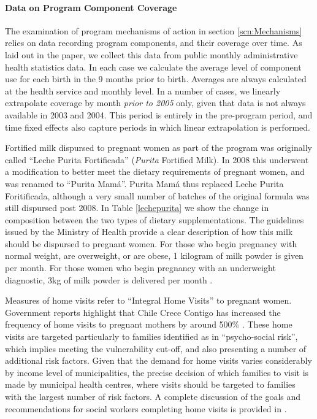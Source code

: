 \documentclass[12pt]{article}
\begin{document}
\begin{spacing}{1.4}
\begin{landscape}
\begin{table}[htpb!]
\begin{tabular}{p{4.5cm}p{5cm}p{10cm}p{2.5cm}}
  \end{tabular}
\end{table}
\end{landscape}

\paragraph{Data on Program Component Coverage}
The examination of program mechanisms of action in section
\ref{scn:Mechanisms} relies on data recording program components,
and their coverage over time.  As laid out in the paper, we
collect this data from public monthly administrative health
statistics data.  In each case we calculate the average
level of component use for each birth in the 9 months prior to
birth.  Averages are always calculated at the health service
and monthly level.  In a number of cases, we linearly
extrapolate coverage by month \emph{prior to 2005} only, 
given that data is not always available in 2003 and 2004.  This
period is entirely in the pre-program period, and time fixed
effects also capture periods in which linear extrapolation
is performed.

Fortified milk dispursed to pregnant women as part of the program
was originally called ``Leche Purita Fortificada'' (\emph{Purita}
Fortified Milk).  In 2008 this underwent a modification to better
meet the dietary requirements of pregnant women, and was renamed to
``Purita Mam\'a''.  Purita Mam\'a thus replaced Leche Purita
Foritificada, although a very small number of batches of the original
formula was still dispursed post 2008.  In Table \ref{lechepurita}
we show the change in composition between the two types of dietary
supplementations.  The guidelines issued by the Ministry of Health
provide a clear description of how this milk should be dispursed
to pregnant women.  For those who begin pregnancy with normal weight,
are overweight, or are obese, 1 kilogram of milk powder is given
per month.  For those women who begin pregnancy with an underweight
diagnostic, 3kg of milk powder is delivered per month \citep{GobChile2008}.

Measures of home visits refer to ``Integral Home Visits'' to
pregnant women.  Government reports highlight that Chile Crece
Contigo has increased the frequency of home visits to pregnant mothers
by around 500\% .  These home visits are targeted particularly
to families identified as in ``psycho-social risk'', which implies
meeting the vulnerability cut-off, and also presenting a number
of additional risk factors.  Given that the demand for home visits
varies considerably by income level of municipalities, the precise
decision of which families to visit is made by municipal health
centres, where visits should be targeted to families with the largest
number of risk factors.  A complete discussion of the goals and
recommendations for social workers completing home visits is provided
in \citet{GobChile2009}.


\end{spacing}
\end{document}
